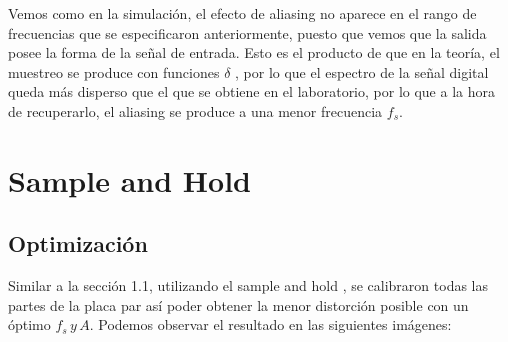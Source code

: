 \documentclass[../../ASSD_TP1_G7.tex]{subfiles}
\begin{document}
Vemos como en la simulación, el efecto de aliasing no aparece en el
rango de frecuencias que se especificaron anteriormente, puesto que
vemos que la salida posee la forma de la señal de entrada. Esto es
el producto de que en la teoría, el muestreo se produce con funciones
$\delta$ , por lo que el espectro de la señal digital queda más disperso
que el que se obtiene en el laboratorio, por lo que a la hora de recuperarlo,
el aliasing se produce a una menor frecuencia $f_{s}$.

\section{Sample and Hold}

\subsection{Optimización}

Similar a la sección 1.1, utilizando el sample and hold , se calibraron
todas las partes de la placa par así poder obtener la menor distorción
posible con un óptimo $f_{s}\,y\,A$. Podemos observar el resultado
en las siguientes imágenes:
\end{document}
